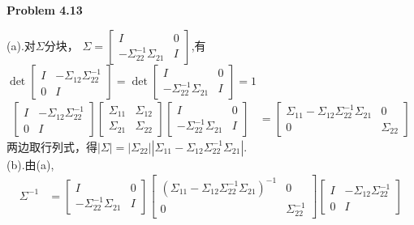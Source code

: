 \documentclass[UTF8,12pt]{article}
\newenvironment{problem}[2][Problem]
{ \begin{mdframed}[backgroundcolor=gray!20] \textbf{#1 #2}}
	{  \end{mdframed}}
\newenvironment{answer}
{}
{}
\newenvironment{eq}
{
	\begin{equation}
		\begin{aligned}\nonumber
}
{
		\end{aligned}
	\end{equation}
}
\begin{document}
\begin{problem}{4.13}
\end{problem}
\begin{answer}
	(a).对$\Sigma$分块，
	$\Sigma=\begin{bmatrix}
		I &  0\\
		-\Sigma_{22}^{-1}\Sigma_{21}& I
	\end{bmatrix}
	$,有$
	\det\begin{bmatrix}
		I & -\Sigma_{12}\Sigma_{22}^{-1} \\
		0 & I
	\end{bmatrix}=\det\begin{bmatrix}
		I &  0\\
		-\Sigma_{22}^{-1}\Sigma_{21}& I
	\end{bmatrix}=1$
		\begin{eq}
			\begin{bmatrix}
				I & -\Sigma_{12}\Sigma_{22}^{-1} \\
			    0 & I
			\end{bmatrix}
			\begin{bmatrix}
				\Sigma_{11} & \Sigma_{12} \\
				\Sigma_{21} & \Sigma_{22}
			\end{bmatrix}
			\begin{bmatrix}
				I &  0\\
			    -\Sigma_{22}^{-1}\Sigma_{21}& I
			\end{bmatrix} &= \begin{bmatrix}
				\Sigma_{11}-\Sigma_{12}\Sigma_{22}^{-1}\Sigma_{21} &  0\\
			    0 & \Sigma_{22}
			\end{bmatrix}
		\end{eq}
		两边取行列式，得$|\Sigma|=|\Sigma_{22}|
		|\Sigma_{11}-\Sigma_{12}\Sigma_{22}^{-1}\Sigma_{21}|$.\\
	(b).由(a),
	\begin{eq}
		\Sigma^{-1} &=  \begin{bmatrix}
			I &  0\\
			-\Sigma_{22}^{-1}\Sigma_{21}& I
		\end{bmatrix}
		\begin{bmatrix}
			(\Sigma_{11}-\Sigma_{12}\Sigma_{22}^{-1}\Sigma_{21})^{-1} &  0\\
			0 & \Sigma_{22}^{-1}
		\end{bmatrix}
		\begin{bmatrix}
			I & -\Sigma_{12}\Sigma_{22}^{-1} \\
			0 & I

\end{bmatrix}
\end{eq}
\end{answer}
\end{document}
